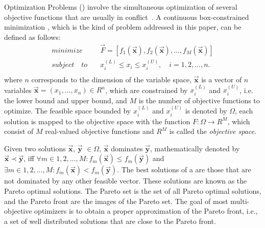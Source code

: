  Optimization Problems (\MOPS{}) 
involve the simultaneous optimization of several objective functions that are usually in conflict~\cite{Joel:Kalyanmoy}. 
%
A continuous box-constrained minimization \MOP{}, which is the kind of problem addressed in this paper, can be defined as follows:
\begin{equation}
   \begin{split}
    minimize \quad & \vec{F} = [f_1(\vec{\mathbf{x}}), f_2(\vec{\mathbf{x}}), ..., f_M(\vec{\mathbf{x}})] \\
   subject \quad to \quad &  x_i^{(L)} \leq x_i \leq x_i^{(U)}, \quad i=1,2,..., n. \\
   \end{split}
\end{equation}
where $n$ corresponds to the dimension of the variable space, $\vec{\mathbf{x}}$ is a vector of $n$ 
variables $\vec{\mathbf{x}}=(x_1, ..., x_n) \in R^n$, which are constrained by $x_i^{(L)}$ 
and $x_i^{(U)}$, i.e. the lower bound and upper bound, and $M$ is the number of objective functions
to optimize.
%
The feasible space bounded by $x_i^{(L)}$ and $x_i^{(U)}$ is denoted by $\Omega$,
each solution is mapped to the objective space with the function $F : \Omega \rightarrow R^M$, 
which consist of $M$ real-valued objective functions and $R^M$ is called the \textit{objective space}. 

Given two solutions $\vec{\mathbf{x}}$, $\vec{\mathbf{y}}$ $\in \Omega$, $\vec{\mathbf{x}}$ dominates $\vec{\mathbf{y}}$, 
mathematically denoted by $\vec{\mathbf{x}} \prec \vec{\mathbf{y}}$, iff $\forall m \in {1,2,...,M} : 
f_m(\vec{\mathbf{x}}) \leq f_m(\vec{\mathbf{y}})$ and $\exists  m \in {1,2,...,M} : f_m(\vec{\mathbf{x}}) < f_m(\vec{\mathbf{y}})$.
%
The best solutions of a \MOP{} are those that are not dominated by any other feasible vector.
%
These solutions are known as the Pareto optimal solutions.
%
The Pareto set is the set of all Pareto optimal solutions, and the Pareto front are the images of the Pareto set. 
%
The goal of most multi-objective optimizers is to obtain a proper approximation of the Pareto front, i.e., 
a set of well distributed solutions that are close to the Pareto front.

